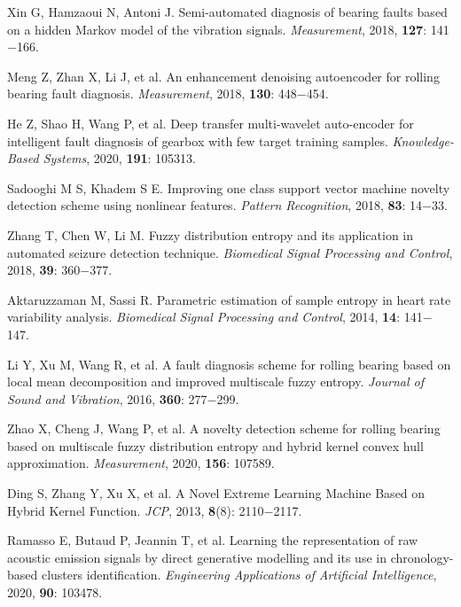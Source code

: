 \documentclass{Style/aas}
\begin{document}
\begin{multicols}{2}
\begin{thebibliography}{99}
     Xin G, Hamzaoui N, Antoni J. Semi-automated diagnosis of bearing faults based on a hidden Markov model of the vibration signals. {\sl Measurement}, 2018,  {\bf 127}: 141$-$166.

     Meng Z, Zhan X, Li J, et al. An enhancement denoising autoencoder for rolling bearing fault diagnosis. {\sl Measurement}, 2018, {\bf 130}: 448$-$454.
 
     He Z, Shao H, Wang P, et al. Deep transfer multi-wavelet auto-encoder for intelligent fault diagnosis of gearbox with few target training samples. {\sl Knowledge-Based Systems}, 2020, {\bf 191}: 105313.

     Sadooghi M S, Khadem S E. Improving one class support vector machine novelty detection scheme using nonlinear features. {\sl Pattern Recognition}, 2018, {\bf 83}: 14$-$33.

     Zhang T, Chen W, Li M. Fuzzy distribution entropy and its application in automated seizure detection technique. {\sl Biomedical Signal Processing and Control}, 2018, {\bf 39}: 360$-$377.

     Aktaruzzaman M, Sassi R. Parametric estimation of sample entropy in heart rate variability analysis. {\sl Biomedical Signal Processing and Control}, 2014, {\bf 14}: 141$-$147.

     Li Y, Xu M, Wang R, et al. A fault diagnosis scheme for rolling bearing based on local mean decomposition and improved multiscale fuzzy entropy. {\sl Journal of Sound and Vibration}, 2016, {\bf 360}: 277$-$299.

     Zhao X, Cheng J, Wang P, et al. A novelty detection scheme for rolling bearing based on multiscale fuzzy distribution entropy and hybrid kernel convex hull approximation. {\sl Measurement}, 2020, {\bf 156}: 107589.

     Ding S, Zhang Y, Xu X, et al. A Novel Extreme Learning Machine Based on Hybrid Kernel Function. {\sl JCP}, 2013, {\bf 8}(8): 2110$-$2117.

     Ramasso E, Butaud P, Jeannin T, et al. Learning the representation of raw acoustic emission signals by direct generative modelling and its use in chronology-based clusters identification. {\sl Engineering Applications of Artificial Intelligence}, 2020, {\bf 90}: 103478.


\end{thebibliography}
\end{multicols}
\end{document}
